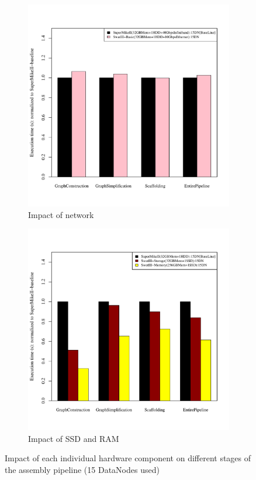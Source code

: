 \documentclass[conference]{IEEEtran}
\begin{document}
\begin{figure}[htb]
	\begin{subfigure}[b]{0.5\textwidth}
                \includegraphics[width=\textwidth]{Figure/PerormanceData/Plots/Network.pdf}
                \caption{Impact of network}
                \label{fig:SuperMikeSwatBasic}
        \end{subfigure}
 	\begin{subfigure}[b]{0.5\textwidth}
                \includegraphics[width=\textwidth]{Figure/PerormanceData/Plots/SupermikeSwatSameNodes.pdf}
                \caption{Impact of SSD and RAM}
                \label{fig:SuperMikeSwatStorageMemory}
   \end{subfigure}
   \caption{Impact of each individual hardware component on different stages of the assembly pipeline (15 DataNodes used)}
  \label{fig:SuperMikeSwat}
\end{figure}
\end{document}
